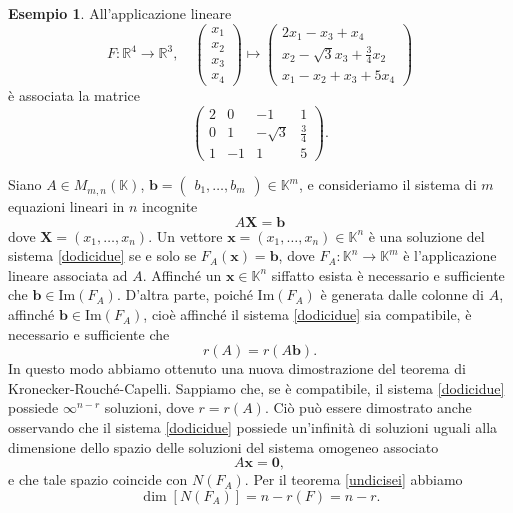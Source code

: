 \documentclass{article}
\theoremstyle{plain}
\theoremstyle{definition}
\newtheorem{exmp}{Esempio}[section]
\theoremstyle{remark}
\begin{document}
\vspace{10pt}

\begin{exmp}
All'applicazione lineare
\[
F \colon \mathbb{R}^4 \to \mathbb{R}^3,\quad\begin{pmatrix}x_1\\x_2\\x_3\\x_4\end{pmatrix}\mapsto\begin{pmatrix}2x_1 - x_3 + x_4\\x_2 - \sqrt{3}x_3 + \frac{3}{4}x_2\\x_1 - x_2 + x_3 + 5x_4\end{pmatrix}
\]
è associata la matrice
\[
\begin{pmatrix}
2 & 0 & -1 & 1 \\
0 & 1 & -\sqrt{3} & \tfrac{3}{4} \\
1 & -1 & 1 & 5
\end{pmatrix}.
\]    
\end{exmp}

\vspace{10pt}

Siano $A \in M_{m,n}(\mathbb{K})$, $\mathbf{b} = \begin{pmatrix} b_1, \ldots, b_m \end{pmatrix} \in \mathbb{K}^m$, 
e consideriamo il sistema di $m$ equazioni lineari in $n$ incognite
\begin{equation}\label{dodicidue}
A\mathbf{X} = \mathbf{b}
\end{equation}
dove $\mathbf{X} = (x_1, \ldots, x_n)$. 
Un vettore $\mathbf{x} = (x_1, \ldots, x_n) \in \mathbb{K}^n$ è una soluzione del sistema \ref{dodicidue} se e solo se 
$F_A(\mathbf{x}) = \mathbf{b}$, dove $F_A \colon \mathbb{K}^n \to \mathbb{K}^m$ è l'applicazione lineare associata ad $A$. 
Affinché un $\mathbf{x} \in \mathbb{K}^n$ siffatto esista è necessario e sufficiente che 
$\mathbf{b} \in \mathrm{Im}(F_A)$.
D'altra parte, poiché $\text{Im}(F_A)$ è generata dalle colonne di $A$, affinché $\mathbf{b} \in \text{Im}(F_A)$, cioè affinché il sistema \ref{dodicidue} sia compatibile, è necessario e sufficiente che
\[r(A) = r(A\mathbf{b}).\]
In questo modo abbiamo ottenuto una nuova dimostrazione del teorema di Kronecker-Rouché-Capelli.
Sappiamo che, se è compatibile, il sistema \ref{dodicidue} possiede $\infty^{n-r}$ soluzioni, dove $r = r(A)$. Ciò può essere dimostrato anche osservando che il sistema \ref{dodicidue} possiede 
un'infinità di soluzioni uguali alla dimensione dello spazio delle soluzioni del sistema omogeneo associato
\[A\mathbf{x} = \mathbf{0},\]
e che tale spazio coincide con $N(F_A)$. 
Per il teorema \ref{undicisei} abbiamo
\[\dim[N(F_A)] = n - r(F) = n - r.\]
\end{document}
